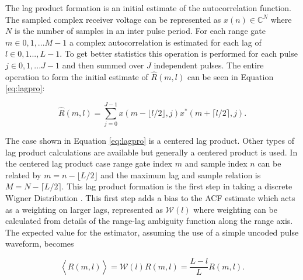 The lag product formation is an initial estimate of the autocorrelation function. The sampled complex receiver voltage can be represented as $x(n) \in\mathbb{C}^N$ where $N$ is the number of samples in an inter pulse period. For each range gate $m\in 0,1,...M-1$ a complex autocorrelation is estimated for each lag of $l \in 0,1...,L-1$.  To get better statistics this operation is performed for each pulse $j\in 0,1,...J-1$ and then summed over $J$ independent pulses. The entire operation to form the initial estimate of $\widehat{R}(m,l)$ can be seen in Equation \ref{eq:lagpro}:

\begin{equation}
\label{eq:lagpro}
\widehat{R}(m,l) = \displaystyle\sum\limits_{j=0}^{J-1} x(m-\lfloor l/2\rfloor,j)x^*(m+\lceil l/2 \rceil,j).
\end{equation}

The case shown in Equation \ref{eq:lagpro} is a centered lag product.  Other types of lag product calculations are available but generally a centered product is used. In the centered lag product case range gate index $m$ and sample index $n$ can be related by $m=n-\lfloor L/2\rfloor$ and the maximum lag and sample relation is $M=N-\lceil L/2 \rceil$.  This lag product formation is the first step in taking a discrete Wigner Distribution \cite{TFAcohen}. This first step adds a bias to the ACF estimate which acts as a weighting on larger lags, represented as $\mathcal{W}(l)$ where weighting can be calculated from details of the range-lag ambiguity function along the range axis. The expected value for the estimator, assuming the use of a simple uncoded pulse waveform, becomes

\begin{equation}
\label{eq:lagprobias}
\left\langle\widehat{R}(m,l) \right\rangle = \mathcal{W}(l)R(m,l) =\frac{L-l}{L}R(m,l).
\end{equation}
%
%

